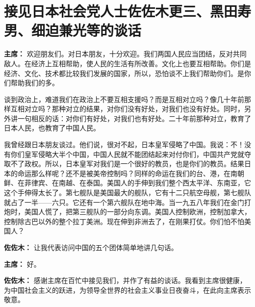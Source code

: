 \section[接见日本社会党人士佐佐木更三、黑田寿男、细迫兼光等的谈话（一九六四年七月十日）]{接见日本社会党人士佐佐木更三、黑田寿男、细迫兼光等的谈话}


\begin{list}{}{
    \setlength{\topsep}{0pt}        %
    \setlength{\partopsep}{0pt}     %
    \setlength{\parsep}{\parskip}   %
    \setlength{\itemsep}{\lineskip}       %
    \setlength{\labelsep}{0pt}%
    \setlength{\labelwidth}{3em}%
    \setlength{\itemindent}{0pt}%
    \setlength\listparindent{\parindent}
    \setlength{\leftmargin}{3em}
    \setlength{\rightmargin}{0pt}
    }

\item[\textbf{主席：}] 欢迎朋友们。对日本朋友，十分欢迎。我们两国人民应当团结，反对共同敌人。在经济上互相帮助，使人民的生活有所改善。文化上也要互相帮助。你们是经济、文化、技术都比较我们发展的国家，所以，恐怕谈不上我们帮助你们。是你们帮助我们的多。

谈到政治上，难道我们在政治上不要互相支援吗？而是互相对立吗？像几十年前那样互相对立吗？那种对立的结果，对你们没有好处，对我们也没有好处。同时，另外讲一句相反的话：对你们有好处，对我们也有好处。二十年前那种对立，教育了日本人民，也教育了中国人民。

我曾经跟日本朋友谈过。他们说，很对不起，日本皇军侵略了中国。我说：不！没有你们皇军侵略大半个中国，中国人民就不能团结起来对付你们，中国共产党就夺取不了政权。所以，日本皇军对我们是一个很好的教员，也是你们的教员。结果日本的命运那么样呢？还不是被美帝控制吗？同样的命运在我们的台、港，在南朝鲜、在菲律宾、在南越、在泰国。美国人的手伸到我们整个西太平洋、东南亚，它这个手伸得太长了。第七舰队是美国最大的舰队，它有十二只航空母舰，第七舰队就占了一半——六只。它还有一个第六舰队在地中海。当一九五八年我们在金门打炮时，美国人慌了，把第三舰队的一部分向东调。美国人控制欧洲，控制加拿大，控制除古巴以外的整个拉丁美洲。现在伸到非洲去了，在刚果打仗。你们怕不怕美国人？

\item[\textbf{佐佐木：}] 让我代表访问中国的五个团体简单地讲几句话。

\item[\textbf{主席：}] 好。

\item[\textbf{佐佐木：}] 感谢主席在百忙中接见我们，并作了有益的谈话。我看到主席很健康，为中国社会主义的跃进，为领导全世界的社会主义事业日夜奋斗，在此向主席表示敬意。


\end{list}
